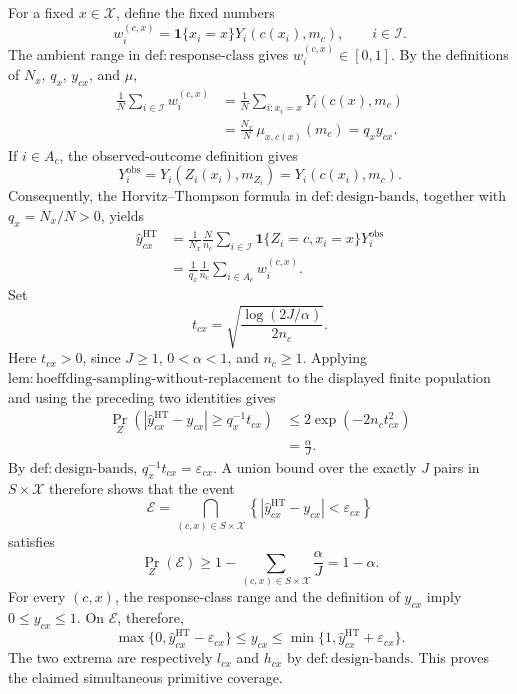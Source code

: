 For a fixed \(x\in\mathcal X\), define the fixed numbers
\[
w_i^{(c,x)}=\mathbf 1\{x_i=x\}Y_i(c(x_i),m_c),\qquad i\in\mathcal I.
\]
The ambient range in \(\mathrm{def{:}response\text{-}class}\) gives \(w_i^{(c,x)}\in[0,1]\).  By the definitions of \(N_x\), \(q_x\), \(y_{cx}\), and \(\mu\),
\[
\begin{aligned}
\frac1N\sum_{i\in\mathcal I}w_i^{(c,x)}
&=\frac1N\sum_{i:x_i=x}Y_i(c(x),m_c)\\
&=\frac{N_x}{N}\,\mu_{x,c(x)}(m_c)
=q_xy_{cx}.
\end{aligned}
\]
If \(i\in A_c\), the observed-outcome definition gives
\[
Y_i^{\mathrm{obs}}
=Y_i(Z_i(x_i),m_{Z_i})
=Y_i(c(x_i),m_c).
\]
Consequently, the Horvitz--Thompson formula in \(\mathrm{def{:}design\text{-}bands}\), together with \(q_x=N_x/N>0\), yields
\[
\begin{aligned}
\widehat y_{cx}^{\mathrm{HT}}
&=\frac1{N_x}\frac N{n_c}
  \sum_{i\in\mathcal I}\mathbf1\{Z_i=c,x_i=x\}Y_i^{\mathrm{obs}}\\
&=\frac1{q_x}\frac1{n_c}\sum_{i\in A_c}w_i^{(c,x)}.
\end{aligned}
\]
Set
\[
t_{cx}=\sqrt{\frac{\log(2J/\alpha)}{2n_c}}.
\]
Here \(t_{cx}>0\), since \(J\geq1\), \(0<\alpha<1\), and \(n_c\geq1\).  Applying \(\mathrm{lem{:}hoeffding\text{-}sampling\text{-}without\text{-}replacement}\) to the displayed finite population and using the preceding two identities gives
\[
\begin{aligned}
\Pr_Z\!\left(
 \left|\widehat y_{cx}^{\mathrm{HT}}-y_{cx}\right|
 \geq q_x^{-1}t_{cx}
\right)
&\leq 2\exp(-2n_ct_{cx}^{2})\\
&=\frac{\alpha}{J}.
\end{aligned}
\]
By \(\mathrm{def{:}design\text{-}bands}\), \(q_x^{-1}t_{cx}=\varepsilon_{cx}\).  A union bound over the exactly \(J\) pairs in \(S\times\mathcal X\) therefore shows that the event
\[
\mathcal E=
\bigcap_{(c,x)\in S\times\mathcal X}
\left\{\left|\widehat y_{cx}^{\mathrm{HT}}-y_{cx}\right|<\varepsilon_{cx}\right\}
\]
satisfies
\[
\Pr_Z(\mathcal E)
\geq 1-\sum_{(c,x)\in S\times\mathcal X}\frac{\alpha}{J}
=1-\alpha.
\]
For every \((c,x)\), the response-class range and the definition of \(y_{cx}\) imply \(0\leq y_{cx}\leq1\).  On \(\mathcal E\), therefore,
\[
\max\{0,\widehat y_{cx}^{\mathrm{HT}}-\varepsilon_{cx}\}
\leq y_{cx}
\leq
\min\{1,\widehat y_{cx}^{\mathrm{HT}}+\varepsilon_{cx}\}.
\]
The two extrema are respectively \(l_{cx}\) and \(h_{cx}\) by \(\mathrm{def{:}design\text{-}bands}\).  This proves the claimed simultaneous primitive coverage.

